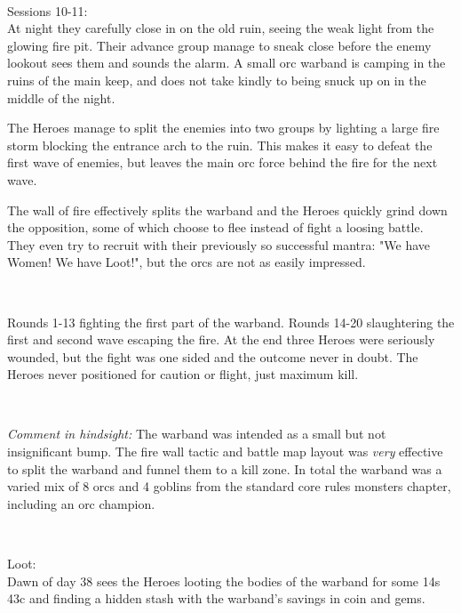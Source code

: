 \


Sessions 10-11:\\                                               %
At night they carefully close in on the old ruin, seeing the weak light from the glowing fire pit. Their advance group manage to sneak close before the enemy lookout sees them and sounds the alarm. A small orc warband is camping in the ruins of the main keep, and does not take kindly to being snuck up on in the middle of the night.

The Heroes manage to split the enemies into two groups by lighting a large fire storm blocking the entrance arch to the ruin. This makes it easy to defeat the first wave of enemies, but leaves the main orc force behind the fire for the next wave.

The wall of fire effectively splits the warband and the Heroes quickly grind down the opposition, some of which choose to flee instead of fight a loosing battle. They even try to recruit with their previously so successful mantra: "We have Women! We have Loot!", but the orcs are not as easily impressed.

\

Rounds 1-13 fighting the first part of the warband.                        %
Rounds 14-20 slaughtering the first and second wave escaping the fire.     %
At the end three Heroes were seriously wounded, but the fight was one sided and the outcome never in doubt. The Heroes never positioned for caution or flight, just maximum kill.

\

\begin{readoutloud}
\emph{Comment in hindsight:} The warband was intended as a small but not insignificant bump. The fire wall tactic and battle map layout was \emph{very} effective to split the warband and funnel them to a kill zone. In total the warband was a varied mix of 8 orcs and 4 goblins from the standard core rules monsters chapter, including an orc champion.
\end{readoutloud}

\

Loot:\\
Dawn of day 38 sees the Heroes looting the bodies of the warband for some 14s 43c and finding a hidden stash with the warband's savings in coin and gems.

